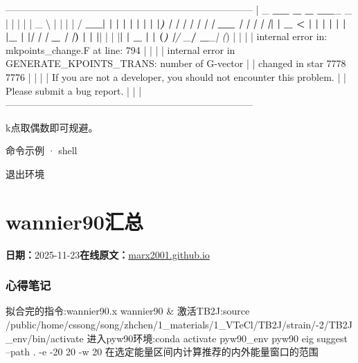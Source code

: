 \documentclass[lang=cn,scheme=chinese,color=blue,device=normal,toc=onecol,math=cm]{elegantbook}
\begin{document}
—————————————————————————– | \_\allowbreak{} \textbf{\_\allowbreak{}\_\allowbreak{} \_\allowbreak{} \_\allowbreak{} \_\allowbreak{}\_\allowbreak{}}\_\allowbreak{} \_\allowbreak{} | | | | | \_\allowbreak{} \textbackslash{}\allowbreak{} | | | | /\allowbreak{} \textbf{\_\allowbreak{}\_\allowbreak{}| | | | | | | | |\emph{) | | | | | | | \_\allowbreak{}\_\allowbreak{} | | | | |}| | \_\allowbreak{} < | | | | | | |\_\allowbreak{} | |\emph{| | | \_\allowbreak{} | |}) | | |}| | | |\textbf{| | \_\allowbreak{} | | (\emph{) |}}\emph{/\allowbreak{} \_\allowbreak{}}\textbf{/\allowbreak{} \_\allowbreak{}}\emph{\_\allowbreak{}| (}) | | | | internal error in: mkpoints\_\allowbreak{}change.F at line: 794 | | | | internal error in GENERATE\_\allowbreak{}KPOINTS\_\allowbreak{}TRANS: number of G-vector | | changed in star 7778 7776 | | | | If you are not a developer, you should not encounter this problem. | | Please submit a bug report. | | | —————————————————————————–\par


k点取偶数即可规避。\par


\begin{inlinecodebox}{命令示例 · shell}
\end{inlinecodebox}


退出环境\par



\section{wannier90汇总}
\begin{articlemeta}
\textbf{日期：}2025-11-23\hfill\textbf{在线原文：}\href{https://marx2001.github.io/sci-note\_posts/20251123}{marx2001.github.io}
\end{articlemeta}

\subsubsection{心得笔记}


拟合完的指令:wannier90.x wannier90 \& 激活TB2J:source /\allowbreak{}public/\allowbreak{}home/\allowbreak{}cssong/\allowbreak{}song/\allowbreak{}zhchen/\allowbreak{}1\_\allowbreak{}materials/\allowbreak{}1\_\allowbreak{}VTeCl/\allowbreak{}TB2J/\allowbreak{}strain/\allowbreak{}-2/\allowbreak{}TB2J\_\allowbreak{}env/\allowbreak{}bin/\allowbreak{}activate 进入pyw90环境:conda activate pyw90\_\allowbreak{}env pyw90 eig suggest –path . -e -20 20 -w 20 在选定能量区间内计算推荐的内外能量窗口的范围\par
\end{document}
